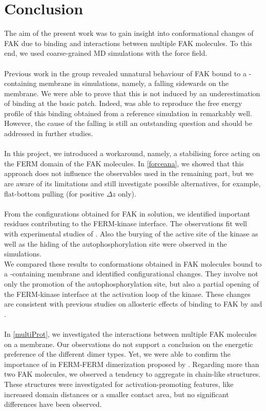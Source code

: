 \chapter{Conclusion}
The aim of the present work was to gain insight into conformational changes of FAK due to \pip{} binding and interactions between multiple FAK molecules. To this end, we used coarse-grained MD simulations with the \martini{} force field.\\
\\
Previous work in the group revealed unnatural behaviour of FAK bound to a \pip{}-containing membrane in \martini{} simulations, namely, a falling sidewards on the membrane. We were able to prove that this is not induced by an underestimation of \pip{} binding at the basic patch. Indeed, \martini{} was able to reproduce the free energy profile of this binding obtained from a reference simulation in \charmm{} remarkably well. However, the cause of the falling is still an outstanding question and should be addressed in further studies.\\ %
\\
In this project, we introduced a workaround, namely, a stabilising force acting on the FERM domain of the FAK molecules. In \autoref{forceana}, we showed that this approach does not influence the observables used in the remaining part, but we are aware of its limitations and still investigate possible alternatives, for example, flat-bottom pulling (for positive $\Delta z$ only).\\
\\
From the configurations obtained for FAK in solution, we identified important residues contributing to the FERM-kinase interface. The observations fit well with experimental studies of \textcite{structFAK}. Also the burying of the active site of the kinase as well as the hiding of the autophosphorylation site were observed in the simulations.\\
We compared these results to conformations obtained in FAK molecules bound to a \pip{}-containing membrane and identified configurational changes. They involve not only the promotion of the autophosphorylation site, but also a partial opening of the FERM-kinase interface at the activation loop of the kinase. These changes are consistent with previous studies on allosteric effects of \pip{} binding to FAK by \textcite{pap001} and \textcite{pap003}.\\
\\
In \autoref{multiProt}, we investigated the interactions between multiple FAK molecules on a membrane. Our observations do not support a conclusion on the energetic preference of the different dimer types. Yet, we were able to confirm the importance of  in FERM-FERM dimerization proposed by \textcite{fakdimers}. Regarding more than two FAK molecules, we observed a tendency to aggregate in chain-like structures. These structures were investigated for activation-promoting features, like increased domain distances or a smaller contact area, but no significant differences have been observed.\\
